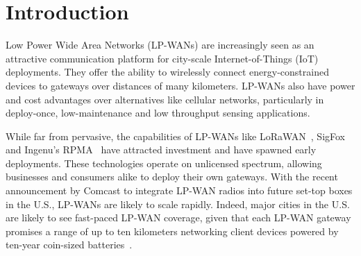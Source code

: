
\section{Introduction}
\label{sec:intro}

Low Power Wide Area Networks (LP-WANs) are increasingly seen as an attractive
communication platform for city-scale Internet-of-Things (IoT) deployments.
They offer the ability to wirelessly connect energy-constrained devices to
gateways over distances of many kilometers. LP-WANs also have power and cost
advantages over alternatives like cellular networks, particularly in
deploy-once, low-maintenance and low throughput sensing applications.

While far from pervasive, the capabilities of LP-WANs like
LoRaWAN~\cite{Sornin2015, LoRaWanAlliance2015}, SigFox~\cite{centenaro2016}
and Ingenu's RPMA~\cite{Ingenu2015} have attracted investment and have spawned
early deployments. These technologies operate on unlicensed spectrum, allowing
businesses and consumers alike to deploy their own gateways. With the
recent announcement by Comcast \cite{comcast, comcast2} to integrate LP-WAN
radios into future set-top boxes in the U.S., LP-WANs are likely to scale
rapidly. Indeed, major cities in the U.S. are likely to see fast-paced LP-WAN
coverage, given that each LP-WAN gateway promises a range of up to ten
kilometers networking client devices powered by ten-year coin-sized batteries~\cite{LoRaWanAlliance2015}.

